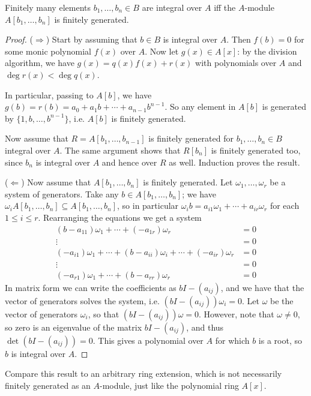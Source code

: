 \begin{prop}[Neukirch 2.2]
	Finitely many elements $b_1,\dots,b_n\in B$ are integral over $A$ iff the $A$-module $A[b_1,\dots,b_n]$ is finitely generated.
\end{prop}
\begin{proof}
	($\Longrightarrow$) Start by assuming that $b\in B$ is integral over $A$. Then $f(b)=0$ for some monic polynomial $f(x)$ over $A$. Now let $g(x)\in A[x]$: by the division algorithm, we have $g(x)=q(x)f(x)+r(x)$ with polynomials over $A$ and $\deg r(x) < \deg q(x)$.

	In particular, passing to $A[b]$, we have $g(b)=r(b)=a_0+a_1b+\cdots+a_{n-1}b^{n-1}$. So any element in $A[b]$ is generated by $\{1,b,\dots,b^{n-1}\}$, i.e. $A[b]$ is finitely generated.

	Now assume that $R=A[b_1,\dots,b_{n-1}]$ is finitely generated for $b_1,\dots,b_n\in B$ integral over $A$. The same argument shows that $R[b_n]$ is finitely generated too, since $b_n$ is integral over $A$ and hence over $R$ as well. Induction proves the result.

	($\Longleftarrow$) Now assume that $A[b_1,\dots,b_n]$ is finitely generated. Let $\omega_1,\dots,\omega_r$ be a system of generators. Take any $b\in A[b_1,\dots,b_n]$; we have $\omega_i A[b_1,\dots,b_n] \subseteq A[b_1,\dots,b_n]$, so in particular $\omega_i b = a_{i1}\omega_1 + \cdots + a_{ir}\omega_r$ for each $1\leq i \leq r$. Rearranging the equations we get a system
	\begin{align*}
		(b-a_{11})\omega_1 + \cdots + (-a_{1r})\omega_r &= 0\\
		\vdots &= 0\\
		(-a_{i1})\omega_1 + \cdots + (b-a_{ii})\omega_i + \cdots + (-a_{ir})\omega_r&=0\\
		\vdots &= 0\\
		(-a_{r1})\omega_1 + \cdots + (b-a_{rr})\omega_r &= 0
	\end{align*}
	In matrix form we can write the coefficients as $bI - (a_{ij})$, and we have that the vector of generators solves the system, i.e. $(bI-(a_{ij}))\omega_i = 0$. Let $\omega$ be the vector of generators $\omega_i$, so that $(bI-(a_{ij}))\omega = 0$. However, note that $\omega\neq 0$, so zero is an eigenvalue of the matrix $bI-(a_{ij})$, and thus $\det(bI-(a_{ij}))=0$. This gives a polynomial over $A$ for which $b$ is a root, so $b$ is integral over $A$.
\end{proof}

Compare this result to an arbitrary ring extension, which is not necessarily finitely generated as an $A$-module, just like the polynomial ring $A[x]$.

